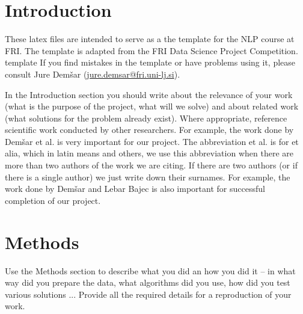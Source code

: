 \documentclass[fleqn,moreauthors,10pt]{ds_report}
\affiliation{\textit{Advisors: Slavko Žitnik}}
\begin{document}
	
	\flushbottom 
	
	\maketitle 
	
	\thispagestyle{empty} 
	
	
	\section*{Introduction}
	These latex files are intended to serve as a the template for the NLP course at FRI.  The template is adapted from the FRI Data Science Project Competition. template  If you find mistakes in the template or have problems using it, please consult Jure Demšar (\href{mailto:jure.demsar@fri.uni-lj.si}{jure.demsar@fri.uni-lj.si}).
	
	In the Introduction section you should write about the relevance of your work (what is the purpose of the project, what will we solve) and about related work (what solutions for the problem already exist). Where appropriate, reference scientific work conducted by other researchers. For example, the work done by Demšar et al. \cite{Demsar2016BalancedMixture} is very important for our project. The abbreviation et al. is for et alia, which in latin means and others, we use this abbreviation when there are more than two authors of the work we are citing. If there are two authors (or if there is a single author) we just write down their surnames. For example, the work done by Demšar and Lebar Bajec \cite{Demsar2017LinguisticEvolution} is also important for successful completion of our project.
	
	
	
	\section*{Methods}
	
	Use the Methods section to describe what you did an how you did it -- in what way did you prepare the data, what algorithms did you use, how did you test various solutions ... Provide all the required details for a reproduction of your work.
	
\end{document}

